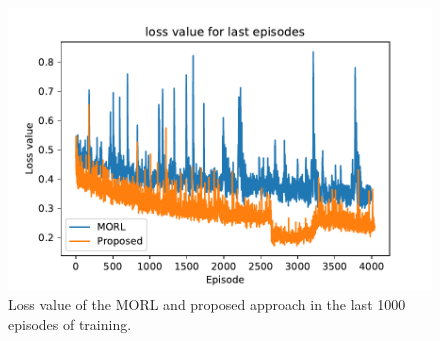 \documentclass[11pt,onecolumn]{IEEEtran}
\begin{document}
\begin{figure}[!htb]
    \centering
    \includegraphics[width=0.9\linewidth]{partial_loss.pdf}
    \caption{Loss value of the MORL and proposed approach in the last 1000 episodes of training.}
    \label{fig:partial_loss}
\end{figure}


\medskip



\end{document}
